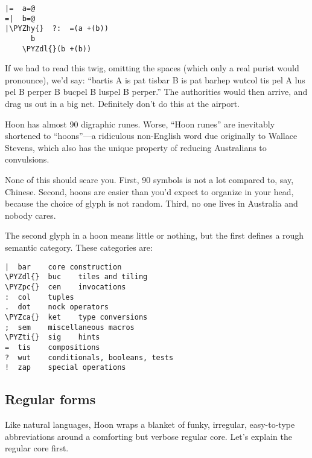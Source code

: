 \begin{framed_shaded}
\begin{Verbatim}[fontsize=\relsize{-2.5},fontseries=b,commandchars=\\\{\}]
|=  a=@
=|  b=@
|\PYZhy{}  ?:  =(a +(b))
      b
    \PYZdl{}(b +(b))
\end{Verbatim}
\end{framed_shaded}
If we had to read this twig, omitting the spaces (which only a
real purist would pronounce), we'd say: ``bartis A is pat tisbar B
is pat barhep wutcol tis pel A lus pel B perper B bucpel B luspel B
perper.'' The authorities would then arrive, and drag us out in a
big net. Definitely don't do this at the airport.

Hoon has almost 90 digraphic runes.  Worse, ``Hoon runes'' are
inevitably shortened to ``hoons''---a ridiculous non-English word
due originally to Wallace Stevens, which also has the unique
property of reducing Australians to convulsions.

None of this should scare you.  First, 90 symbols is not a lot
compared to, say, Chinese.  Second, hoons are easier than you'd
expect to organize in your head, because the choice of glyph is
not random.  Third, no one lives in Australia and nobody cares.

The second glyph in a hoon means little or nothing, but the first
defines a rough semantic category.   These categories are:

\begin{framed_shaded}
\begin{Verbatim}[fontsize=\relsize{-2.5},fontseries=b,commandchars=\\\{\}]
|  bar    core construction
\PYZdl{}  buc    tiles and tiling
\PYZpc{}  cen    invocations
:  col    tuples
.  dot    nock operators
\PYZca{}  ket    type conversions
;  sem    miscellaneous macros
\PYZti{}  sig    hints
=  tis    compositions
?  wut    conditionals, booleans, tests
!  zap    special operations
\end{Verbatim}
\end{framed_shaded}

\subsection{Regular forms}

Like natural languages, Hoon wraps a blanket of funky, irregular,
easy-to-type abbreviations around a comforting but verbose
regular core.  Let's explain the regular core first.

